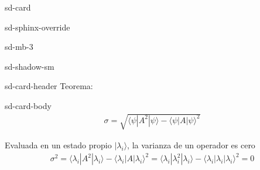 \documentclass[letterpaper,10pt,english]{jupyterBook}
\newcommand{\bra}[1]{\langle #1|}
\newcommand{\ket}[1]{|#1\rangle}
\begin{document}
\begin{sphinxuseclass}{sd-card}
\begin{sphinxuseclass}{sd-sphinx-override}
\begin{sphinxuseclass}{sd-mb-3}
\begin{sphinxuseclass}{sd-shadow-sm}
\begin{sphinxuseclass}{sd-card-header}
\sphinxAtStartPar
Teorema:

\end{sphinxuseclass}
\begin{sphinxuseclass}{sd-card-body}\begin{equation*}
\begin{split} \sigma = \sqrt{\bra{\psi}A^2\ket{\psi} - \bra{\psi} A\ket{\psi}^2}
\end{split}
\end{equation*}
\end{sphinxuseclass}
\end{sphinxuseclass}
\end{sphinxuseclass}
\end{sphinxuseclass}
\end{sphinxuseclass}
\sphinxAtStartPar
Evaluada en un estado propio \(\ket{\lambda_i}\), la varianza de un operador es cero
\begin{equation*}
\begin{split}
\sigma^2 = \bra{\lambda_i}A^2\ket{\lambda_i} - \bra{\lambda_i} A\ket{\lambda_i}^2 = \bra{\lambda_i}\lambda_i^2\ket{\lambda_i} - \bra{\lambda_i} \lambda_i\ket{\lambda_i}^2 = 0
\end{split}
\end{equation*}
\end{document}
